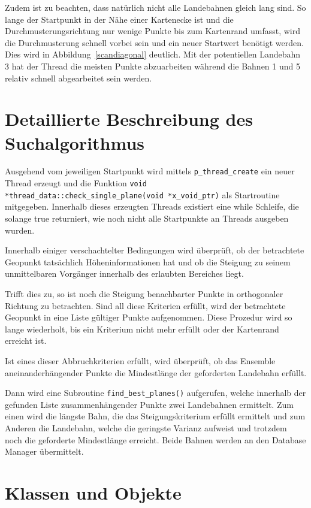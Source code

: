 \documentclass[10pt,a4paper]{report}
\begin{document}
Zudem ist zu beachten, dass natürlich nicht alle Landebahnen gleich lang sind. So lange der Startpunkt in der Nähe einer Kartenecke ist und die Durchmusterungsrichtung nur wenige Punkte bis zum Kartenrand umfasst, wird die Durchmusterung schnell vorbei sein und ein neuer Startwert benötigt werden. Dies wird in Abbildung~\ref{scandiagonal} deutlich. Mit der potentiellen Landebahn 3 hat der Thread die meisten Punkte abzuarbeiten während die Bahnen 1 und 5 relativ schnell abgearbeitet sein werden. 

\section{Detaillierte Beschreibung des Suchalgorithmus}

Ausgehend vom jeweiligen Startpunkt wird mittels \texttt{p\_thread\_create} ein neuer Thread erzeugt und die Funktion \texttt{void *thread\_data::check\_single\_plane(void *x\_void\_ptr)} als Startroutine mitgegeben. Innerhalb dieses erzeugten Threads existiert eine while Schleife, die solange true returniert, wie noch nicht alle Startpunkte an Threads ausgeben wurden.

Innerhalb einiger verschachtelter Bedingungen wird überprüft, ob der betrachtete Geopunkt tatsächlich Höheninformationen hat und ob die Steigung zu seinem unmittelbaren Vorgänger innerhalb des erlaubten Bereiches liegt.

Trifft dies zu, so ist noch die Steigung benachbarter Punkte in orthogonaler Richtung zu betrachten. Sind all diese Kriterien erfüllt, wird der betrachtete Geopunkt in eine Liste gültiger Punkte aufgenommen. Diese Prozedur wird so lange wiederholt, bis ein Kriterium nicht mehr erfüllt oder der Kartenrand erreicht ist.

Ist eines dieser Abbruchkriterien erfüllt, wird überprüft, ob das Ensemble aneinanderhängender Punkte die Mindestlänge der geforderten Landebahn erfüllt.

Dann wird eine Subroutine \texttt{find\_best\_planes()} aufgerufen, welche innerhalb der gefunden Liste zusammenhängender Punkte zwei Landebahnen ermittelt. Zum einen wird die längste Bahn, die das Steigungskriterium erfüllt ermittelt und zum Anderen die Landebahn, welche die geringste Varianz aufweist und trotzdem noch die geforderte Mindestlänge erreicht. 
Beide Bahnen werden an den Database Manager übermittelt.

\section{Klassen und Objekte}
\end{document}
